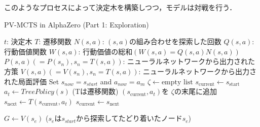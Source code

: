 	
このようなプロセスによって決定木を構築しつつ，モデルは対戦を行う．
\newpage
\begin{algorithm}
    \caption{PV-MCTS in AlphaZero (Part 1: Exploration)}
    \label{alg:mcts-1}
    \begin{algorithmic}[1]
        \State $t$: 決定木
        \State $T$: 遷移関数
        \State $N(s, a)$: $(s, a)$の組み合わせを探索した回数
        \State $Q(s, a)$: 行動価値関数 
        \State $W(s, a)$: 行動価値の総和$(W(s, a)=Q(s, a)N(s, a))$
        \State $P(s, a)(=P(s_n), s_n=T(s, a))$: 
        \State ニューラルネットワークから出力された方策
        \State $V(s, a)(=V(s_n), s_n=T(s, a))$: 
        \State ニューラルネットワークから出力された局面評価
            \State Set $s_{now} = s_{start}$ and $a_{now} = a_m$
                \State $\zeta \gets \textrm{empty list}$
                \State $s_{\text{current}} \gets s_{\text{start}}$
                    \State $a_t \gets TreePolicy(s)$
                    \State (Tは遷移関数)
                    \State $(s_{\text{current}}, a_t)$を $\zeta $の末尾に追加
                    \State $s_{\text{next}} \gets T(s_{\text{current}}, a_t)$
                    \State $s_{\text{current}} \gets s_{\text{next}}$
                    
                \EndWhile
                \State $G \gets V(s_e)$ 
                \State($s_e$は$s_{start}$から探索してたどり着いたノード$s_e$)
                \State {}
            \EndFor
        \EndFunction
        
        
    \end{algorithmic}
\end{algorithm}
